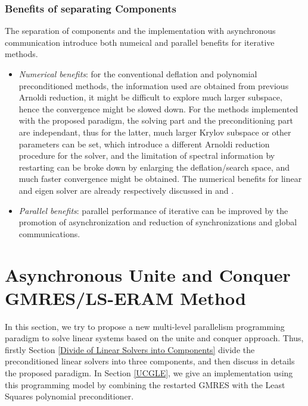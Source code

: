 \subsubsection{Benefits of separating Components}

The separation of components and the implementation with asynchronous communication introduce both numeical and parallel benefits for iterative methods.

\begin{itemize}
	\item \textit{Numerical benefits}: for the conventional deflation and polynomial preconditioned methods, the information used are obtained from previous Arnoldi reduction, it might be difficult to explore much larger subspace, hence the convergence might be slowed down. For the methods implemented with the proposed paradigm, the solving part and the preconditioning part are independant, thus for the latter, much larger Krylov subspace or other parameters can be set, which introduce a different Arnoldi reduction procedure for the solver, and the limitation of spectral information by restarting can be broke down by enlarging the deflation/search space, and much faster convergence might be obtained. The numerical benefits for linear and eigen solver are already respectively discussed in \cite{Wu:2018:DPA:3149457.3154481} and \cite{emad2005multiple}.
	
	\item \textit{Parallel benefits}: parallel performance of iterative can be improved by the promotion of asynchronization and reduction of synchronizations and global communications.
\end{itemize}

\section{Asynchronous Unite and Conquer GMRES/LS-ERAM Method}\label{Asynchronous Unite and Conquer GMRES/LS-ERAM Method}

In this section, we try to propose a new multi-level parallelism programming paradigm to solve linear systems based on the unite and conquer approach. Thus, firstly Section \ref{Divide of Linear Solvers into Components} divide the preconditioned linear solvers into three components, and then discuss in details the proposed paradigm. In Section \ref{UCGLE}, we give an implementation using this programming model by combining the restarted GMRES with the Least Squares polynomial preconditioner.

